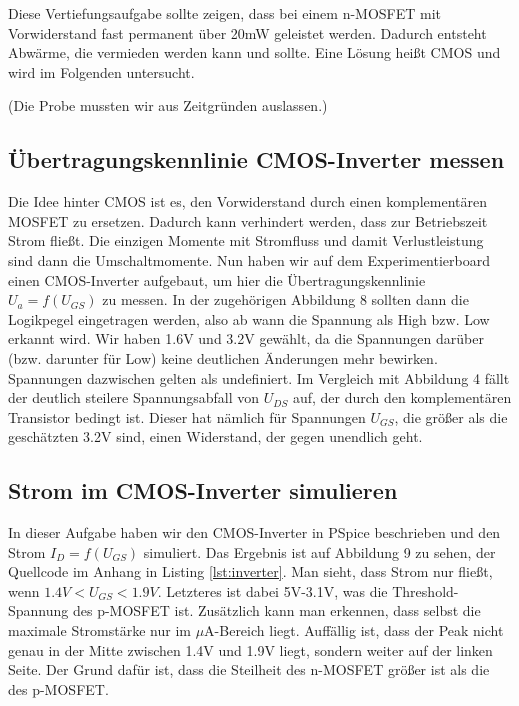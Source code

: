 \documentclass[12pt,a4paper]{scrartcl}
\begin{document}
Diese Vertiefungsaufgabe sollte zeigen, dass bei einem n-MOSFET mit Vorwiderstand fast permanent \"uber 20mW geleistet werden.
Dadurch entsteht Abw\"arme, die vermieden werden kann und sollte.
Eine L\"osung hei\ss t CMOS und wird im Folgenden untersucht.

(Die Probe mussten wir aus Zeitgr\"unden auslassen.)

\subsection{\"Ubertragungskennlinie CMOS-Inverter messen}
\label{invertermessen}
Die Idee hinter CMOS ist es, den Vorwiderstand durch einen komplement\"aren MOSFET zu ersetzen.
Dadurch kann verhindert werden, dass zur Betriebszeit Strom flie\ss t.
Die einzigen Momente mit Stromfluss und damit Verlustleistung sind dann die Umschaltmomente.
Nun haben wir auf dem Experimentierboard einen CMOS-Inverter aufgebaut, um hier die \"Ubertragungskennlinie $U_a=f(U_{GS})$ zu messen.
In der zugeh\"origen Abbildung 8 sollten dann die Logikpegel eingetragen werden, also ab wann die Spannung als High bzw. Low erkannt wird.
Wir haben 1.6V und 3.2V gew\"ahlt, da die Spannungen dar\"uber (bzw. darunter f\"ur Low) keine deutlichen \"Anderungen mehr bewirken.
Spannungen dazwischen gelten als undefiniert.
Im Vergleich mit Abbildung 4 f\"allt der deutlich steilere Spannungsabfall von $U_{DS}$ auf, der durch den komplement\"aren Transistor bedingt ist.
Dieser hat n\"amlich f\"ur Spannungen $U_{GS}$, die gr\"o\ss er als die gesch\"atzten 3.2V sind, einen Widerstand, der gegen unendlich geht.

\subsection{Strom im CMOS-Inverter simulieren}
In dieser Aufgabe haben wir den CMOS-Inverter in PSpice beschrieben und den Strom $I_D=f(U_{GS})$ simuliert.
Das Ergebnis ist auf Abbildung 9 zu sehen, der Quellcode im Anhang in Listing \ref{lst:inverter}.
Man sieht, dass Strom nur flie\ss t, wenn $1.4V < U_{GS} < 1.9V$.
Letzteres ist dabei 5V-3.1V, was die Threshold-Spannung des p-MOSFET ist.
Zus\"atzlich kann man erkennen, dass selbst die maximale Stromst\"arke nur im $\mu$A-Bereich liegt.
Auff\"allig ist, dass der Peak nicht genau in der Mitte zwischen 1.4V und 1.9V liegt, sondern weiter auf der linken Seite.
Der Grund daf\"ur ist, dass die Steilheit des n-MOSFET gr\"o\ss er ist als die des p-MOSFET.
\end{document}
